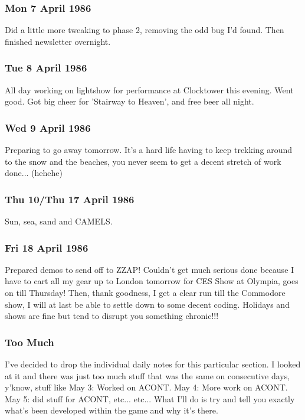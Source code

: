 \subsubsection{Mon 7 April 1986}
Did a little more tweaking to phase 2, removing the odd bug I'd found. Then finished newsletter overnight.

\subsubsection{Tue 8 April 1986}
All day working on lightshow for performance at Clocktower this evening. Went good. Got big cheer for 'Stairway to Heaven', and free beer all night.

\subsubsection{Wed 9 April 1986}
Preparing to go away tomorrow. It's a hard life having to keep trekking around to the snow and the beaches, you never seem to get a decent stretch of work done... (hehehe)

\subsubsection{Thu 10/Thu 17 April 1986}
Sun, sea, sand and CAMELS.

\subsubsection{Fri 18 April 1986}
Prepared demos to send off to ZZAP! Couldn't get much serious done because I have to cart all my gear up to London tomorrow for CES Show at Olympia, goes on till Thursday! Then, thank goodness, I get a clear run till the Commodore show, I will at last be able to settle down to some decent coding. Holidays and shows are fine but tend to disrupt you something chronic!!!


\subsubsection{Too Much}
I've decided to drop the individual daily notes for this particular section. I looked at it and there was just too much stuff that was the same on consecutive days, y'know, stuff like May 3: Worked on ACONT. May 4: More work on ACONT. May 5: did stuff for ACONT, etc... etc... What I'll do is try and tell you exactly what's been developed within the game and why it's there.

